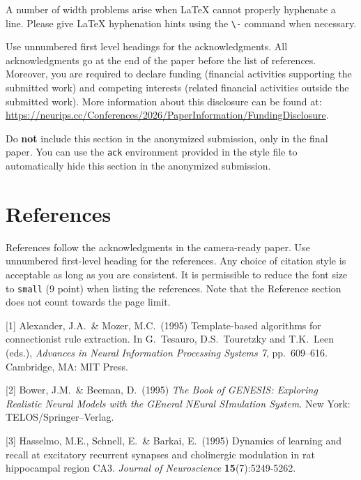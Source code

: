 \documentclass{article}
\begin{document}
A number of width problems arise when \LaTeX{} cannot properly hyphenate a
line. Please give LaTeX hyphenation hints using the \verb+\-+ command when
necessary.

\begin{ack}
Use unnumbered first level headings for the acknowledgments. All acknowledgments
go at the end of the paper before the list of references. Moreover, you are required to declare
funding (financial activities supporting the submitted work) and competing interests (related financial activities outside the submitted work).
More information about this disclosure can be found at: \url{https://neurips.cc/Conferences/2026/PaperInformation/FundingDisclosure}.


Do {\bf not} include this section in the anonymized submission, only in the final paper. You can use the \texttt{ack} environment provided in the style file to automatically hide this section in the anonymized submission.
\end{ack}

\section*{References}


References follow the acknowledgments in the camera-ready paper. Use unnumbered first-level heading for
the references. Any choice of citation style is acceptable as long as you are
consistent. It is permissible to reduce the font size to \verb+small+ (9 point)
when listing the references.
Note that the Reference section does not count towards the page limit.
\medskip


{
\small


[1] Alexander, J.A.\ \& Mozer, M.C.\ (1995) Template-based algorithms for
connectionist rule extraction. In G.\ Tesauro, D.S.\ Touretzky and T.K.\ Leen
(eds.), {\it Advances in Neural Information Processing Systems 7},
pp.\ 609--616. Cambridge, MA: MIT Press.


[2] Bower, J.M.\ \& Beeman, D.\ (1995) {\it The Book of GENESIS: Exploring
  Realistic Neural Models with the GEneral NEural SImulation System.}  New York:
TELOS/Springer--Verlag.


[3] Hasselmo, M.E., Schnell, E.\ \& Barkai, E.\ (1995) Dynamics of learning and
recall at excitatory recurrent synapses and cholinergic modulation in rat
hippocampal region CA3. {\it Journal of Neuroscience} {\bf 15}(7):5249-5262.
}


\end{document}
